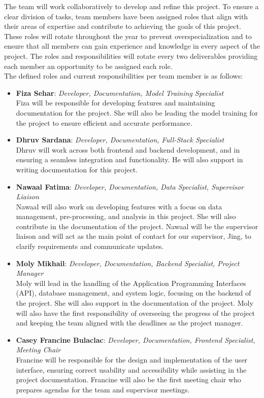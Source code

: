 \documentclass{article}
\begin{document}
The team will work collaboratively to develop and refine this project. To ensure a clear 
division of tasks, team members have been assigned roles that 
align with their areas of expertise and contribute to achieving the goals 
of this project. These roles will rotate throughout the year to prevent overspecialization
and to ensure that all members can gain experience and knowledge in 
every aspect of the project. The roles and responsibilities will rotate every two deliverables 
providing each member an opportunity to be assigned each role.\\[1ex]
The defined roles and current responsibilities per team member is as follows: 
\begin{itemize}
	\item \textbf{Fiza Sehar}: \textit{Developer, Documentation, Model Training Specialist} \\
	Fiza will be responsible for developing features and maintaining documentation for the 
  project. She will also be leading the model training for the project to ensure 
  efficient and accurate performance.
	\item \textbf{Dhruv Sardana}: \textit{Developer, Documentation, Full-Stack Specialist} \\
	Dhruv will work across both frontend and backend development, and in ensuring a 
  seamless integration and functionality. He will also support in writing documentation
  for this project. 
	\item \textbf{Nawaal Fatima}: \textit{Developer, Documentation, Data Specialist, Supervisor Liaison} \\
	Nawaal will also work on developing features with a 
  focus on data management, pre-processing, and analysis in this project. She 
  will also contribute in the documentation of the project. Nawaal will be the supervisor liaison and 
  will act as the main point of contact for our supervisor, Jing, to clarify 
  requirements and communicate updates. 
	\item \textbf{Moly Mikhail}: \textit{Developer, Documentation, Backend Specialist, Project Manager} \\
	Moly will lead in the handling of the Application Programming Interfaces (API), database management, and system logic, focusing on 
  the backend of the project. She will also support in the documentation of the project. Moly will also have the 
  first responsibility of overseeing the progress of the project and keeping the team 
  aligned with the deadlines as the project manager.
	\item \textbf{Casey Francine Bulaclac}: \textit{Developer, Documentation, Frontend Specialist, Meeting Chair} \\
	Francine will be responsible for the design and implementation of the user interface, 
  ensuring correct usability and accessibility while assisting in the project 
  documentation. Francine will also be the first meeting chair who prepares agendas 
  for the team and supervisor meetings.
\end{itemize}
\end{document}
